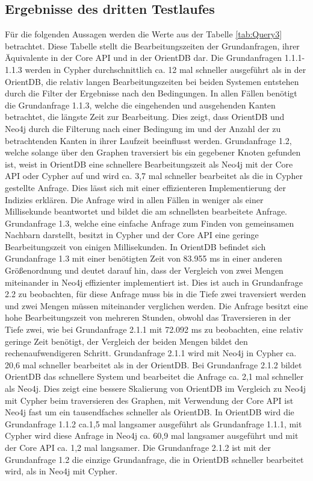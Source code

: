 \subsection{Ergebnisse des dritten Testlaufes}
Für die folgenden Aussagen werden die Werte aus der Tabelle \ref{tab:Query3}  betrachtet. Diese Tabelle stellt die Bearbeitungszeiten der Grundanfragen, ihrer Äquivalente in der Core API und in der OrientDB dar. \newline
Die Grundanfragen 1.1.1-1.1.3 werden in Cypher durchschnittlich ca. 12 mal schneller ausgeführt als in der OrientDB, die relativ langen Bearbeitungszeiten bei beiden Systemen entstehen durch die Filter der Ergebnisse nach den Bedingungen. In allen Fällen benötigt die Grundanfrage 1.1.3, welche die eingehenden und ausgehenden Kanten betrachtet, die längste Zeit zur Bearbeitung. Dies zeigt, dass OrientDB und Neo4j durch die Filterung nach einer Bedingung im und der Anzahl der zu betrachtenden Kanten in ihrer Laufzeit beeinflusst werden. \newline
 Grundanfrage 1.2, welche solange über den Graphen traversiert bis ein gegebener Knoten gefunden ist, weist in OrientDB eine schnellere Bearbeitungszeit als Neo4j mit der Core API oder Cypher auf und wird ca. 3,7 mal schneller bearbeitet als die in Cypher gestellte Anfrage. Dies lässt sich mit einer effizienteren Implementierung der Indizies erklären. Die Anfrage wird in allen Fällen in weniger als einer Millisekunde beantwortet und bildet die am schnellsten bearbeitete Anfrage. \newline
Grundanfrage 1.3, welche eine einfache Anfrage zum Finden von gemeinsamen Nachbarn darstellt, besitzt in Cypher und der Core API eine geringe Bearbeitungszeit von einigen Millisekunden. In OrientDB befindet sich Grundanfrage 1.3 mit einer benötigten Zeit von 83.955 ms in einer anderen Größenordnung und deutet darauf hin, dass der Vergleich von zwei Mengen miteinander in Neo4j effizienter implementiert ist. Dies ist auch in Grundanfrage 2.2 zu beobachten, für diese Anfrage muss bis in die Tiefe zwei traversiert werden und zwei Mengen müssen miteinander verglichen werden. Die Anfrage besitzt eine hohe Bearbeitungszeit von mehreren Stunden, obwohl das Traversieren in der Tiefe zwei, wie bei Grundanfrage 2.1.1 mit 72.092 ms zu beobachten, eine relativ geringe Zeit benötigt, der Vergleich der beiden Mengen bildet den rechenaufwendigeren Schritt. \newline
 Grundanfrage 2.1.1 wird mit Neo4j in Cypher ca. 20,6 mal schneller bearbeitet als in der OrientDB. Bei Grundanfrage 2.1.2 bildet OrientDB das schnellere System und bearbeitet die Anfrage ca. 2,1 mal schneller als Neo4j. Dies zeigt eine bessere Skalierung von OrientDB im Vergleich zu Neo4j mit Cypher beim traversieren des Graphen, mit Verwendung der Core API ist Neo4j fast um ein tausendfaches schneller als OrientDB. In OrientDB wird die Grundanfrage 1.1.2 ca.1,5 mal langsamer ausgeführt als Grundanfrage 1.1.1, mit Cypher wird diese Anfrage in Neo4j ca. 60,9 mal langsamer ausgeführt und mit der Core API ca. 1,2 mal langsamer. Die Grundanfrage 2.1.2 ist mit der Grundanfrage 1.2 die einzige Grundanfrage, die in OrientDB schneller bearbeitet wird, als in Neo4j mit Cypher. \newline  
